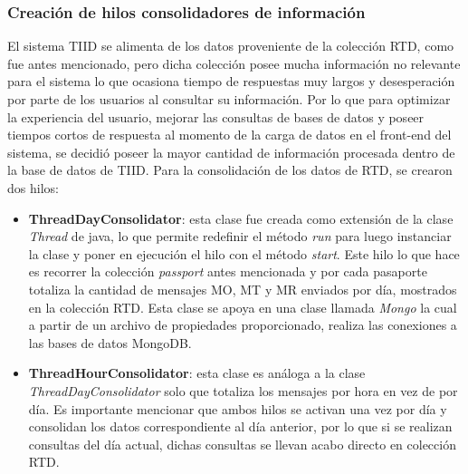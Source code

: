 \subsubsection{Creación de hilos consolidadores de información}
\indent El sistema TIID se alimenta de los datos proveniente de la colección RTD, como fue antes mencionado, pero dicha colección posee mucha información no relevante para el sistema lo que ocasiona tiempo de respuestas muy largos y desesperación por parte de los usuarios al consultar su información. Por lo que para optimizar la experiencia del usuario, mejorar las consultas de bases de datos y poseer tiempos cortos de respuesta al momento de la carga de datos en el front-end del sistema, se decidió poseer la mayor cantidad de información procesada dentro de la base de datos de TIID.
\newline
\newline
\indent Para la consolidación de los datos de RTD, se crearon dos hilos:
\begin{itemize}[noitemsep,nolistsep]
\item \textbf{ThreadDayConsolidator}: esta clase fue creada como extensión de la clase \textit{Thread} de java, lo que permite redefinir el método \textit{run} para luego instanciar la clase y poner en ejecución el hilo con el método \textit{start}. Este hilo lo que hace es recorrer la colección \textit{passport} antes mencionada y por cada pasaporte totaliza la cantidad de mensajes MO, MT y MR enviados por día, mostrados en la colección RTD. Esta clase se apoya en una clase llamada \textit{Mongo} la cual a partir de un archivo de propiedades proporcionado, realiza las conexiones a las bases de datos MongoDB.
\item \textbf{ThreadHourConsolidator}: esta clase es análoga a la clase \textit{ThreadDayConsolidator} solo que totaliza los mensajes por hora en vez de por día. Es importante mencionar que ambos hilos se activan una vez por día y consolidan los datos correspondiente al día anterior, por lo que si se realizan consultas del día actual, dichas consultas se llevan acabo directo en colección RTD.
\end{itemize}

